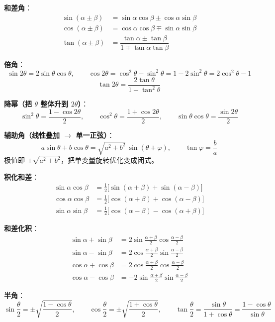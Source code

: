 	\textbf{和差角}：
	\begin{align*}
		\sin(\alpha \pm \beta) & = \sin\alpha\cos\beta \pm \cos\alpha\sin\beta                                  \\
		\cos(\alpha \pm \beta) & = \cos\alpha\cos\beta \mp \sin\alpha\sin\beta                                  \\
		\tan(\alpha \pm \beta) & = \dfrac{\tan\alpha \pm \tan\beta}{1 \mp \tan\alpha\tan\beta}
	\end{align*}

	\textbf{倍角}：
	$$
	\sin 2\theta = 2\sin\theta\cos\theta, \qquad
	\cos 2\theta = \cos^2\theta - \sin^2\theta = 1 - 2\sin^2\theta = 2\cos^2\theta - 1
	$$
	$$
	\tan 2\theta = \dfrac{2\tan\theta}{1 - \tan^2\theta}
	$$

	\textbf{降幂（把 $\theta$ 整体升到 $2\theta$）}：
	$$
	\sin^2\theta = \dfrac{1 - \cos 2\theta}{2}, \qquad
	\cos^2\theta = \dfrac{1 + \cos 2\theta}{2}, \qquad
	\sin\theta\cos\theta = \dfrac{\sin 2\theta}{2}
	$$

	\textbf{辅助角（线性叠加 $\to$ 单一正弦）}：
	$$
	a\sin\theta + b\cos\theta = \sqrt{a^2 + b^2}\,\sin(\theta + \varphi),
	\qquad \tan\varphi = \dfrac{b}{a}
	$$
	极值即 $\pm\sqrt{a^2 + b^2}$，把单变量旋转优化变成闭式。

	\textbf{积化和差}：
	\begin{align*}
		\sin\alpha\cos\beta & = \tfrac{1}{2}\bigl[\sin(\alpha+\beta) + \sin(\alpha-\beta)\bigr] \\
		\cos\alpha\cos\beta & = \tfrac{1}{2}\bigl[\cos(\alpha+\beta) + \cos(\alpha-\beta)\bigr] \\
		\sin\alpha\sin\beta & = \tfrac{1}{2}\bigl[\cos(\alpha-\beta) - \cos(\alpha+\beta)\bigr]
	\end{align*}

	\textbf{和差化积}：
	\begin{align*}
		\sin\alpha + \sin\beta & = 2\sin\tfrac{\alpha+\beta}{2}\cos\tfrac{\alpha-\beta}{2}  \\
		\sin\alpha - \sin\beta & = 2\cos\tfrac{\alpha+\beta}{2}\sin\tfrac{\alpha-\beta}{2}  \\
		\cos\alpha + \cos\beta & = 2\cos\tfrac{\alpha+\beta}{2}\cos\tfrac{\alpha-\beta}{2}  \\
		\cos\alpha - \cos\beta & = -2\sin\tfrac{\alpha+\beta}{2}\sin\tfrac{\alpha-\beta}{2}
	\end{align*}

	\textbf{半角}：
	$$
	\sin\dfrac{\theta}{2} = \pm\sqrt{\dfrac{1-\cos\theta}{2}}, \qquad
	\cos\dfrac{\theta}{2} = \pm\sqrt{\dfrac{1+\cos\theta}{2}}, \qquad
	\tan\dfrac{\theta}{2} = \dfrac{\sin\theta}{1+\cos\theta} = \dfrac{1-\cos\theta}{\sin\theta}
	$$

